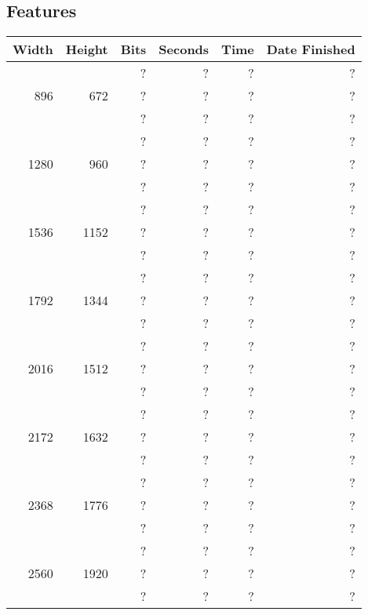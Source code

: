 \subsection{Features}
  \begin{center}
  \begin{tabular}{ r r r | r r r }
  Width & Height & Bits & Seconds & Time & Date Finished \\ \hline
  \multirow{3}{*}{896} & \multirow{3}{*}{672} & ? & ? & ? & ? \\
  & & ? & ? & ? & ? \\
  & & ? & ? & ? & ? \\
  \hline
  \multirow{3}{*}{1280} & \multirow{3}{*}{960} & ? & ? & ? & ? \\
  & & ? & ? & ? & ? \\
  & & ? & ? & ? & ? \\
  \hline
  \multirow{3}{*}{1536} & \multirow{3}{*}{1152} & ? & ? & ? & ? \\
  & & ? & ? & ? & ? \\
  & & ? & ? & ? & ? \\
  \hline
  \multirow{3}{*}{1792} & \multirow{3}{*}{1344} & ? & ? & ? & ? \\
  & & ? & ? & ? & ? \\
  & & ? & ? & ? & ? \\
  \hline
  \multirow{3}{*}{2016} & \multirow{3}{*}{1512} & ? & ? & ? & ? \\
  & & ? & ? & ? & ? \\
  & & ? & ? & ? & ? \\
  \hline
  \multirow{3}{*}{2172} & \multirow{3}{*}{1632} & ? & ? & ? & ? \\
  & & ? & ? & ? & ? \\
  & & ? & ? & ? & ? \\
  \hline
  \multirow{3}{*}{2368} & \multirow{3}{*}{1776} & ? & ? & ? & ? \\
  & & ? & ? & ? & ? \\
  & & ? & ? & ? & ? \\
  \hline
  \multirow{3}{*}{2560} & \multirow{3}{*}{1920} & ? & ? & ? & ? \\
  & & ? & ? & ? & ? \\
  & & ? & ? & ? & ? \\
  \end{tabular}
  \end{center}
  
\newpage

